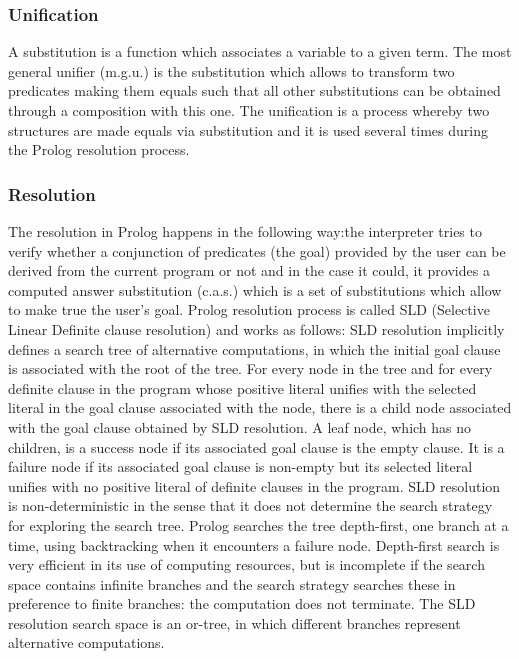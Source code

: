 \subsubsection{Unification}\label{subsubsec:Unification}
A substitution is a function which associates a variable to a given term. The most general unifier (m.g.u.) is the substitution which allows to transform two predicates making them equals
such that all other substitutions can be obtained through a composition with this one.
The unification is a process whereby two structures are made equals via substitution and it is used several times during the Prolog resolution process. 

\subsubsection{Resolution}\label{subsubsec:resolution}
The resolution in Prolog happens in the following way:the interpreter tries to verify whether a conjunction of predicates (the goal) provided by the user can be derived
from the current program or not and in the case it could, it provides a computed answer substitution (c.a.s.) which is a set of substitutions which allow to make true the user's goal.\newline
Prolog resolution process is called SLD (Selective Linear Definite clause resolution) and works as follows:\newline
SLD resolution implicitly defines a search tree of alternative computations, in which the initial goal clause is associated with the root of the tree. For every node in the tree and for every definite clause in the program whose positive literal unifies with the selected literal in the goal clause associated with the node, there is a child node associated with the goal clause obtained by SLD resolution.
A leaf node, which has no children, is a success node if its associated goal clause is the empty clause. It is a failure node if its associated goal clause is non-empty but its selected literal unifies with no positive literal of definite clauses in the program.
SLD resolution is non-deterministic in the sense that it does not determine the search strategy for exploring the search tree. Prolog searches the tree depth-first, one branch at a time, using backtracking when it encounters a failure node. Depth-first search is very efficient in its use of computing resources, but is incomplete if the search space contains infinite branches and the search strategy searches these in preference to finite branches: the computation does not terminate.
The SLD resolution search space is an or-tree, in which different branches represent alternative computations.\cite{Gallier1985LogicFC}

